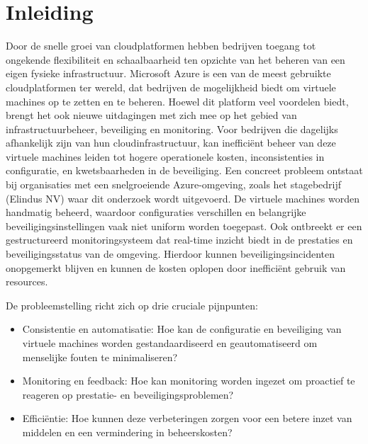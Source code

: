 


% 

\section{Inleiding}%
\label{sec:inleiding}

Door de snelle groei van cloudplatformen hebben bedrijven toegang tot ongekende flexibiliteit en schaalbaarheid ten opzichte van het beheren van een eigen fysieke infrastructuur.
Microsoft Azure is een van de meest gebruikte cloudplatformen ter wereld, dat bedrijven de mogelijkheid biedt om virtuele machines op te zetten en te beheren.
Hoewel dit platform veel voordelen biedt, brengt het ook nieuwe uitdagingen met zich mee op het gebied van infrastructuurbeheer, beveiliging en monitoring.
Voor bedrijven die dagelijks afhankelijk zijn van hun cloudinfrastructuur, kan inefficiënt beheer van deze virtuele machines leiden tot hogere operationele kosten, inconsistenties in configuratie, en kwetsbaarheden in de beveiliging.
Een concreet probleem ontstaat bij organisaties met een snelgroeiende Azure-omgeving, zoals het stagebedrijf (Elindus NV) waar dit onderzoek wordt uitgevoerd.
De virtuele machines worden handmatig beheerd, waardoor configuraties verschillen en belangrijke beveiligingsinstellingen vaak niet uniform worden toegepast.
Ook ontbreekt er een gestructureerd monitoringsysteem dat real-time inzicht biedt in de prestaties en beveiligingsstatus van de omgeving.
Hierdoor kunnen beveiligingsincidenten onopgemerkt blijven en kunnen de kosten oplopen door inefficiënt gebruik van resources.

De probleemstelling richt zich op drie cruciale pijnpunten:

\begin{itemize}
  \item Consistentie en automatisatie: Hoe kan de configuratie en beveiliging van virtuele machines worden gestandaardiseerd en geautomatiseerd om menselijke fouten te minimaliseren?
  \item Monitoring en feedback: Hoe kan monitoring worden ingezet om proactief te reageren op prestatie- en beveiligingsproblemen?
  \item Efficiëntie: Hoe kunnen deze verbeteringen zorgen voor een betere inzet van middelen en een vermindering in beheerskosten?
\end{itemize}

